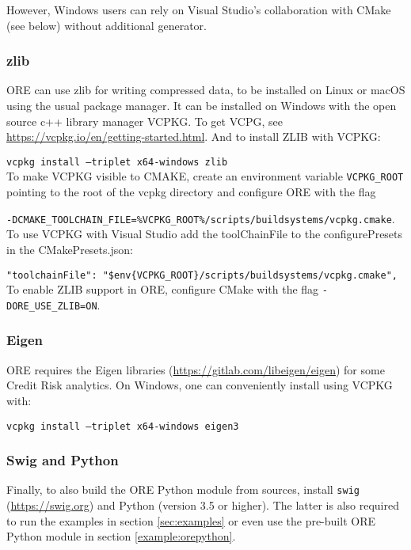 However, Windows users can rely on Visual Studio's collaboration with CMake (see below) without additional generator.

\subsubsection*{zlib}

ORE can use zlib for writing compressed data, to be installed on Linux or macOS using the usual package manager.
It can be installed on Windows with the open source c++ library manager VCPKG.
To get VCPG, see \url{https://vcpkg.io/en/getting-started.html}. And to install ZLIB with VCPKG:

\medskip
{\tt vcpkg install --triplet x64-windows zlib} \\

\medskip
To make VCPKG visible to CMAKE, create an environment variable {\tt VCPKG\_ROOT} pointing to the root of the vcpkg directory
and configure ORE with the flag

\medskip
{\tt -DCMAKE\_TOOLCHAIN\_FILE=\%VCPKG\_ROOT\%/scripts/buildsystems/vcpkg.cmake}. \\

\medskip
To use VCPKG with Visual Studio add the toolChainFile to the configurePresets in the CMakePresets.json:

\medskip
{\tt "toolchainFile": "\$env\{VCPKG\_ROOT\}/scripts/buildsystems/vcpkg.cmake",}\\

\medskip
To enable ZLIB support in ORE, configure CMake with the flag {\tt -DORE\_USE\_ZLIB=ON}.

\subsubsection*{Eigen}

ORE requires the Eigen libraries (\url{https://gitlab.com/libeigen/eigen}) for some Credit Risk analytics.
On Windows, one can conveniently install using VCPKG with:

\medskip
{\tt vcpkg install --triplet x64-windows eigen3}

\subsubsection*{Swig and Python}

Finally, to also build the ORE Python module from sources, install {\tt swig} (\url{https://swig.org}) and
Python (version 3.5 or higher). The latter is also required to run the examples in section \ref{sec:examples}
or even use the pre-built ORE Python module in section \ref{example:orepython}. 

